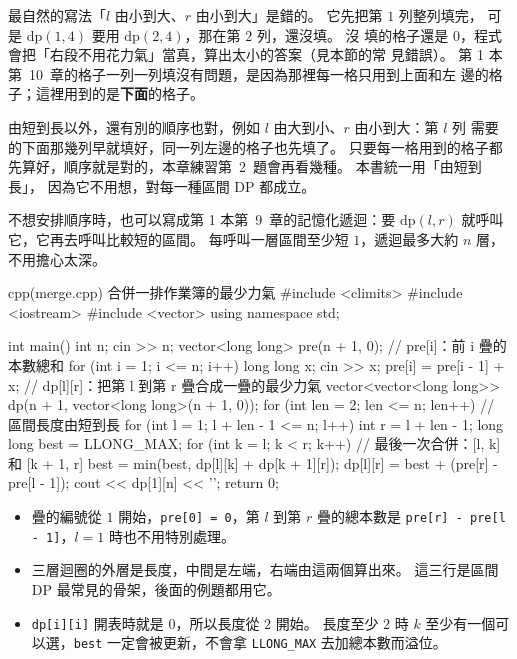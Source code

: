 最自然的寫法「$l$ 由小到大、$r$ 由小到大」是錯的。 它先把第 $1$ 列整列填完，
可是 $\mathrm{dp}(1, 4)$ 要用 $\mathrm{dp}(2, 4)$，那在第 $2$ 列，還沒填。 沒
填的格子還是 $0$，程式會把「右段不用花力氣」當真，算出太小的答案（見本節的常
見錯誤）。 第 1 本第~10~章的格子一列一列填沒有問題，是因為那裡每一格只用到上面和左
邊的格子；這裡用到的是\textbf{下面}的格子。

由短到長以外，還有別的順序也對，例如 $l$ 由大到小、$r$ 由小到大：第 $l$ 列
需要的下面那幾列早就填好，同一列左邊的格子也先填了。 只要每一格用到的格子都
先算好，順序就是對的，本章練習第~2~題會再看幾種。 本書統一用「由短到長」，
因為它不用想，對每一種區間 DP 都成立。

不想安排順序時，也可以寫成第 1 本第~9~章的記憶化遞迴：要 $\mathrm{dp}(l, r)$ 就呼叫
它，它再去呼叫比較短的區間。 每呼叫一層區間至少短 $1$，遞迴最多大約 $n$ 層，
不用擔心太深。

\begin{example}[label=ex:ivdp-merge]{cpp}{(merge.cpp) 合併一排作業簿的最少力氣}
#include <climits>
#include <iostream>
#include <vector>
using namespace std;

int main() {
    int n;
    cin >> n;
    vector<long long> pre(n + 1, 0);          // pre[i]：前 i 疊的本數總和
    for (int i = 1; i <= n; i++) {
        long long x;
        cin >> x;
        pre[i] = pre[i - 1] + x;
    }
    // dp[l][r]：把第 l 到第 r 疊合成一疊的最少力氣
    vector<vector<long long>> dp(n + 1, vector<long long>(n + 1, 0));
    for (int len = 2; len <= n; len++) {      // 區間長度由短到長
        for (int l = 1; l + len - 1 <= n; l++) {
            int r = l + len - 1;
            long long best = LLONG_MAX;
            for (int k = l; k < r; k++) {     // 最後一次合併：[l, k] 和 [k + 1, r]
                best = min(best, dp[l][k] + dp[k + 1][r]);
            }
            dp[l][r] = best + (pre[r] - pre[l - 1]);
        }
    }
    cout << dp[1][n] << '\n';
    return 0;
}
\end{example}


\begin{itemize}
\item 疊的編號從 $1$ 開始，\texttt{pre[0] = 0}，第 $l$ 到第 $r$ 疊的總本數是
\texttt{pre[r] - pre[l - 1]}，$l = 1$ 時也不用特別處理。
\item 三層迴圈的外層是長度，中間是左端，右端由這兩個算出來。 這三行是區間 DP
最常見的骨架，後面的例題都用它。
\item \texttt{dp[i][i]} 開表時就是 $0$，所以長度從 $2$ 開始。 長度至少 $2$ 時
$k$ 至少有一個可以選，\texttt{best} 一定會被更新，不會拿 \texttt{LLONG\_MAX}
去加總本數而溢位。
\end{itemize}

